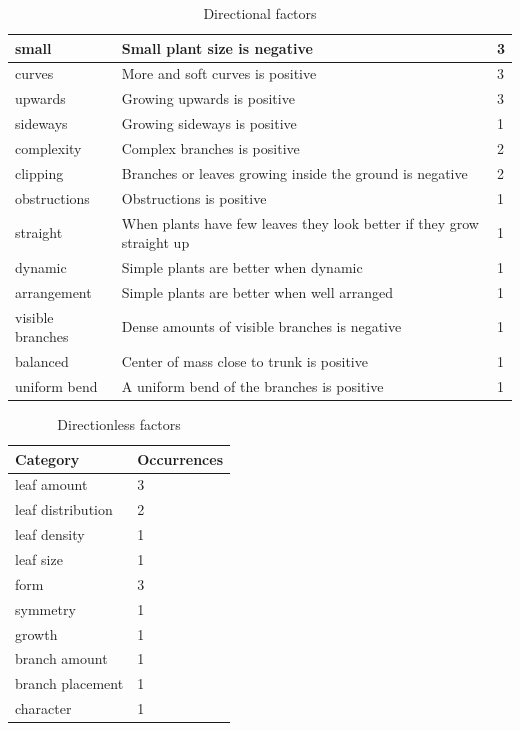 \begin{table}
\begin{tabularx}{\textwidth}{| l | X | l |}
    \hline
    small & Small plant size is negative & 3 \\
    \hline
    curves & More and soft curves is positive & 3 \\
    \hline
    upwards & Growing upwards is positive & 3 \\
    \hline
    sideways & Growing sideways is positive & 1 \\
    \hline
    complexity & Complex branches is positive & 2 \\
    \hline
    clipping & Branches or leaves growing inside the ground is negative & 2 \\
    \hline
    obstructions & Obstructions is positive & 1 \\
    \hline
    straight & When plants have few leaves they look better if they grow straight up & 1 \\
    \hline
    dynamic & Simple plants are better when dynamic & 1 \\
    \hline
    arrangement & Simple plants are better when well arranged & 1 \\
    \hline
    visible branches & Dense amounts of visible branches is negative & 1 \\
    \hline
    balanced & Center of mass close to trunk is positive & 1 \\
    \hline
    uniform bend & A uniform bend of the branches is positive & 1 \\
    \hline
    \end{tabularx}
    \caption{Directional factors}
    \label{tab:factors-dir}
\end{table}

\begin{table}
    \centering
    \begin{tabular}{| l | l |}
    \hline
    \textbf{Category} & \textbf{Occurrences} \\
    \hline
    leaf amount & 3 \\
    leaf distribution & 2 \\
    leaf density & 1 \\
    leaf size & 1 \\
    form & 3 \\
    symmetry & 1 \\
    growth & 1 \\
    branch amount & 1 \\
    branch placement & 1 \\
    character & 1 \\
    \hline
    \end{tabular}
    \caption{Directionless factors}
    \label{tab:factors-nodir}
\end{table}

